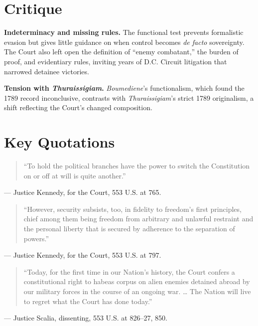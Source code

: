 \documentclass[12pt]{article}
\begin{document}
\section{Critique}

\textbf{Indeterminacy and missing rules.} The functional test prevents formalistic evasion but gives little guidance on when control becomes \textit{de facto} sovereignty. The Court also left open the definition of ``enemy combatant,'' the burden of proof, and evidentiary rules, inviting years of D.C. Circuit litigation that narrowed detainee victories.

\textbf{Tension with \textit{Thuraissigiam}.} \textit{Boumediene}'s functionalism, which found the 1789 record inconclusive, contrasts with \textit{Thuraissigiam}'s strict 1789 originalism, a shift reflecting the Court's changed composition.

\section{Key Quotations}

\begin{quote}
``To hold the political branches have the power to switch the Constitution on or off at will is quite another.''
\end{quote}
\noindent --- Justice Kennedy, for the Court, 553 U.S. at 765.

\begin{quote}
``However, security subsists, too, in fidelity to freedom's first principles, chief among them being freedom from arbitrary and unlawful restraint and the personal liberty that is secured by adherence to the separation of powers.''
\end{quote}
\noindent --- Justice Kennedy, for the Court, 553 U.S. at 797.

\begin{quote}
``Today, for the first time in our Nation's history, the Court confers a constitutional right to habeas corpus on alien enemies detained abroad by our military forces in the course of an ongoing war. \ldots{} The Nation will live to regret what the Court has done today.''
\end{quote}
\noindent --- Justice Scalia, dissenting, 553 U.S. at 826--27, 850.
\end{document}
